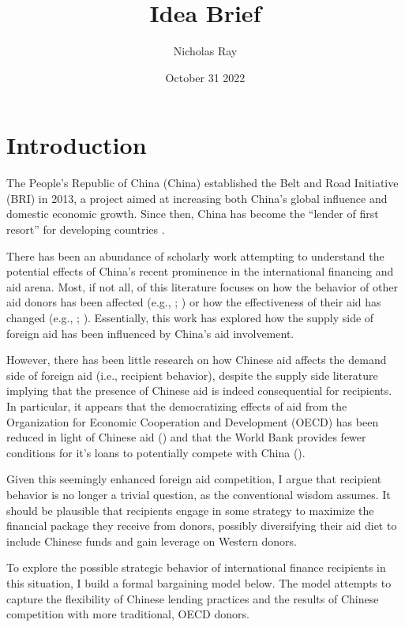\documentclass{article}
\title{\vspace{-2.75cm}Idea Brief\vspace{-0.5cm}}
\author{Nicholas Ray}
\date{\vspace{-0.30cm}October 31 2022\vspace{-1cm}}
\begin{document}
\maketitle
\section*{Introduction}
The People's Republic of China (China) established the Belt and Road Initiative (BRI) in 2013, a project aimed at increasing both China's global influence and domestic economic growth. Since then, China has become the ``lender of first resort'' for developing countries \parencite[1]{dreher2022}.

There has been an abundance of scholarly work attempting to understand the potential effects of China's recent prominence in the international financing and aid arena. Most, if not all, of this literature focuses on how the behavior of other aid donors has been affected (e.g., \cite{humphrey2019}; \cite{kilama2016a}) or how the effectiveness of their aid has changed (e.g., \cite{blair2022}; \cite{gehring2022}). Essentially, this work has explored how the supply side of foreign aid has been influenced by China's aid involvement. 

However, there has been little research on how Chinese aid affects the demand side of foreign aid (i.e., recipient behavior), despite the supply side literature implying that the presence of Chinese aid is indeed consequential for recipients. In particular, it appears that the democratizing effects of aid from the Organization for Economic Cooperation and Development (OECD) has been reduced in light of Chinese aid (\cite{li2017a}) and that the World Bank provides fewer conditions for it's loans to potentially compete with China (\cite{hernandez2017}).

Given this seemingly enhanced foreign aid competition, I argue that recipient behavior is no longer a trivial question, as the conventional wisdom assumes. It should be plausible that recipients engage in some strategy to maximize the financial package they receive from donors, possibly diversifying their aid diet to include Chinese funds and gain leverage on Western donors. 

To explore the possible strategic behavior of international finance recipients in this situation, I build a formal bargaining model below. The model attempts to capture the flexibility of Chinese lending practices and the results of Chinese competition with more traditional, OECD donors.
\end{document}

